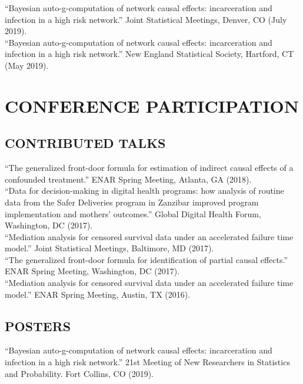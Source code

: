 \documentclass[12pt]{article}
\begin{document}
``Bayesian auto-g-computation of network causal effects: incarceration and infection in a high risk network.'' Joint Statistical Meetings, Denver, CO (July 2019). \\

``Bayesian auto-g-computation of network causal effects: incarceration and infection in a high risk network.'' New England Statistical Society, Hartford, CT (May 2019). 

\section*{\textbf{{\large C}{ONFERENCE} {\large P}{ARTICIPATION}}}  

\subsection*{\textbf{CONTRIBUTED TALKS}}


``The generalized front-door formula for estimation of indirect causal effects of a confounded treatment.'' ENAR Spring Meeting, Atlanta, GA (2018). \\

``Data for decision-making in digital health programs: how analysis of routine data from the Safer Deliveries program in Zanzibar improved program implementation and mothers' outcomes.'' Global Digital Health Forum, Washington, DC (2017). \\

``Mediation analysis for censored survival data under an accelerated failure time model.'' Joint Statistical Meetings, Baltimore, MD (2017). \\

``The generalized front-door formula for identification of partial causal effects.'' ENAR Spring Meeting, Washington, DC (2017). \\

``Mediation analysis for censored survival data under an accelerated failure time model.'' ENAR Spring Meeting, Austin, TX (2016). 

\subsection*{\textbf{ POSTERS}}

``Bayesian auto-g-computation of network causal effects: incarceration and infection in a high risk network.'' 21st Meeting of New Researchers in 
Statistics and Probability. Fort Collins, CO (2019). \\
\end{document}
